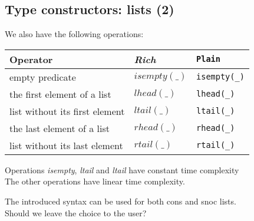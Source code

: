 \documentclass{article}
\newcommand{\f}[1]{\ensuremath{\mathit{#1}}}
\newcommand{\fa}[2]{\ensuremath{\f{#1}(#2)}}
\begin{document}
\begin{slidetop}
\section*{Type constructors: lists (2)}

\bigskip
We also have the following operations:
\begin{center}
\begin{tabular}{|l@{\qquad}L@{\qquad}l|}
\hline
Operator                       & \textit{Rich}          & \verb+Plain+\\\hline
empty predicate                & \fa{isempty}{\_}       & \verb+isempty(_)+\\
the first element of a list    & \fa{lhead}{\_}         & \verb+lhead(_)+\\
list without its first element & \fa{ltail}{\_}         & \verb+ltail(_)+\\
the last element of a list     & \fa{rhead}{\_}         & \verb+rhead(_)+\\
list without its last element  & \fa{rtail}{\_}         & \verb+rtail(_)+\\
\hline
\end{tabular}
\end{center}

\bigskip
Operations \emph{isempty}, \emph{ltail} and \emph{ltail} have constant time complexity\\
The other operations have linear time complexity.

\bigskip
The introduced syntax can be used for both cons and snoc lists.\\
Should we leave the choice to the user?
\end{slidetop}
\end{document}
